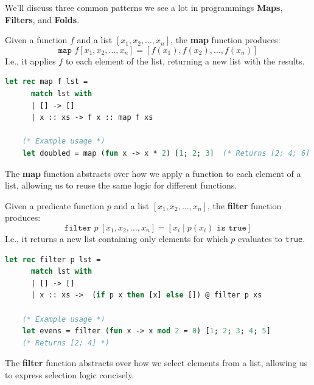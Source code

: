 \noindent
We'll discuss three common patterns we see a lot in programmings \textbf{Maps}, \textbf{Filters}, and \textbf{Folds}.

\newpage 

\noindent

\begin{Def}

    Given a function \( f \) and a list \([x_1, x_2, \dots, x_n]\), the \textbf{map} function produces:
    \[
    \texttt{map } f [x_1, x_2, \dots, x_n] = [f(x_1), f(x_2), \dots, f(x_n)]
    \]
    \noindent
    I.e., it applies \( f \) to each element of the list, returning a new list with the results.\\
    \begin{lstlisting}[language=OCaml, caption={Ocaml Implementation of Map}, numbers=none]
    let rec map f lst =
      match lst with
      | [] -> []
      | x :: xs -> f x :: map f xs

    (* Example usage *)
    let doubled = map (fun x -> x * 2) [1; 2; 3]  (* Returns [2; 4; 6] *)
    \end{lstlisting}

    \noindent
    The \textbf{map} function abstracts over how we apply a function to each element of a list, allowing us to reuse the same logic for different functions.
\end{Def}

\noindent
\begin{Def}

    Given a predicate function \( p \) and a list \([x_1, x_2, \dots, x_n]\), the \textbf{filter} function produces:
    \[
    \texttt{filter } p\ [x_1, x_2, \dots, x_n] = [x_i \mid p(x_i) \texttt{ is true}]
    \]
    \noindent
    I.e., it returns a new list containing only elements for which \( p \) evaluates to \texttt{true}.\\

    \begin{lstlisting}[language=OCaml, caption={Ocaml Implementation of Filter}, numbers=none]
    let rec filter p lst =
      match lst with
      | [] -> []
      | x :: xs ->  (if p x then [x] else []) @ filter p xs

    (* Example usage *)
    let evens = filter (fun x -> x mod 2 = 0) [1; 2; 3; 4; 5]
    (* Returns [2; 4] *)
    \end{lstlisting}

    \noindent
    The \textbf{filter} function abstracts over how we select elements from a list, allowing us to express selection logic concisely.
\end{Def}

